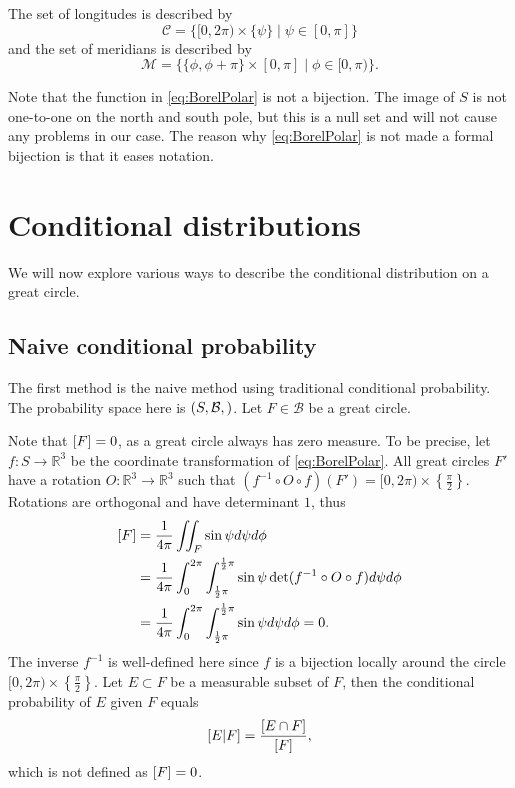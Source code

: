 \documentclass[twoside,a4paper]{report}
\theoremstyle{plain}
\theoremstyle{definition}
\theoremstyle{remark}
\numberwithin{equation}{chapter}
\newcommand{\R}{\mathbb{R}}
\let\P\relax
\DeclareMathOperator{\P}{\mathbb{P}}
\DeclareMathOperator{\1}{\mathbbm{1}}
\newcommand{\B}{\mathcal{B}}
\begin{document}
The set of longitudes is described by 
\begin{equation}
\mathcal{C}=\{[0,2\pi)\times\{\psi\}\mid\psi\in[0,\pi]\}
\end{equation}
and the set of meridians is described by
\begin{equation}
\mathcal{M}=\{\{\phi,\phi+\pi\}\times[0,\pi]\mid\phi\in[0,\pi)\}.
\end{equation}

Note that the function in \eqref{eq:BorelPolar} is not a bijection. The image of $S$ is not one-to-one on the north and south pole, but this is a null set and will not cause any problems in our case. The reason why \eqref{eq:BorelPolar} is not made a formal bijection is that it eases notation.

\section{Conditional distributions}
We will now explore various ways to describe the conditional distribution on a great circle.
\subsection{Naive conditional probability}\label{sec:BorelNaive}
The first method is the naive method using traditional conditional probability. The probability space here is $(S,\B,\P)$. Let $F\in\B$ be a great circle.

Note that $\P[F]=0$, as a great circle always has zero measure. To be precise, let $f\colon S\to\R^3$ be the coordinate transformation of \eqref{eq:BorelPolar}. All great circles $F'$ have a rotation $O\colon\R^3\to\R^3$ such that $(f^{-1}\circ O\circ f)(F')=[0,2\pi)\times\left\{\frac{\pi}{2}\right\}$. Rotations are orthogonal and have determinant $1$, thus
\begin{align}
\P[F]&=\frac{1}{4\pi}\iint_F\sin\psi d\psi d\phi\\
&=\frac{1}{4\pi}\int_0^{2\pi}\int_{\frac{1}{2}\pi}^{\frac{1}{2}\pi}\sin\psi \det(f^{-1}\circ O\circ f)d\psi d\phi\\
&=\frac{1}{4\pi}\int_0^{2\pi}\int_{\frac{1}{2}\pi}^{\frac{1}{2}\pi}\sin\psi d\psi d\phi=0.
\end{align}
The inverse $f^{-1}$ is well-defined here since $f$ is a bijection locally around the circle $[0,2\pi)\times\left\{\frac{\pi}{2}\right\}$. Let $E\subset F$ be a measurable subset of $F$, then the conditional probability of $E$ given $F$ equals
\begin{equation}
\P[E|F]=\frac{\P[E\cap F]}{\P[F]},
\end{equation}
which is not defined as $\P[F]=0$.
\end{document}

